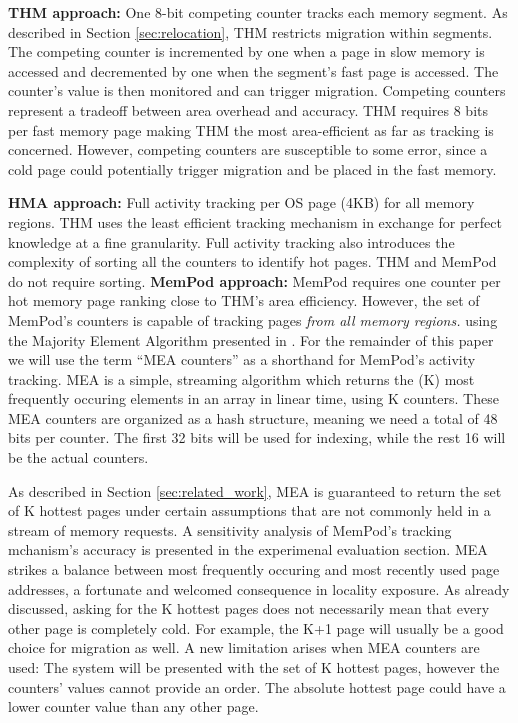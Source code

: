 	\textbf{THM approach:} One 8-bit competing counter tracks each memory segment. As described in Section \ref{sec:relocation}, THM restricts migration within segments. The competing counter is incremented by one when a page in slow memory is accessed and decremented by one when the segment's fast page is accessed. The counter's value is then monitored and can trigger migration. Competing counters represent a tradeoff between area overhead and accuracy. THM requires 8 bits per fast memory page making THM the most area-efficient as far as tracking is concerned. However, competing counters are susceptible to some error, since a cold page could potentially trigger migration and be placed in the fast memory.

	\textbf{HMA approach:} Full activity tracking per OS page (4KB) for all memory regions. THM uses the least efficient tracking mechanism in exchange for perfect knowledge at a fine granularity. Full activity tracking also introduces the complexity of sorting all the counters to identify hot pages. THM and MemPod do not require sorting.
	\textbf{MemPod approach:} MemPod requires one counter per hot memory page ranking close to THM's area efficiency. However, the set of MemPod's counters is capable of tracking pages \textit{from all memory regions.} using the Majority Element Algorithm presented in . For the remainder of this paper we will use the term ``MEA counters'' as a shorthand for MemPod's activity tracking. MEA is a simple, streaming algorithm which returns the (K) most frequently occuring elements in an array in linear time, using K counters. These MEA counters are organized as a hash structure, meaning we need a total of 48 bits per counter. The first 32 bits will be used for indexing, while the rest 16 will be the actual counters. 

As described in Section \ref{sec:related_work}, MEA is guaranteed to return the set of K hottest pages under certain assumptions that are not commonly held in a stream of memory requests. A sensitivity analysis of MemPod's tracking mchanism's accuracy is presented in the experimenal evaluation section. MEA strikes a balance between most frequently occuring and most recently used page addresses, a fortunate and welcomed consequence in locality exposure. As already discussed, asking for the K hottest pages does not necessarily mean that every other page is completely cold. For example, the K+1 page will usually be a good choice for migration as well. A new limitation arises when MEA counters are used: The system will be presented with the set of K hottest pages, however the counters' values cannot provide an order. The absolute hottest page could have a lower counter value than any other page.

